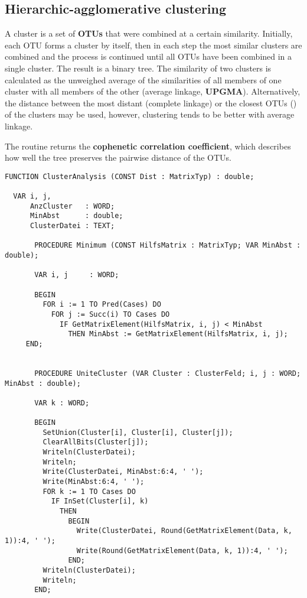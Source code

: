 \begin{refsection}
\section{Hierarchic-agglomerative clustering}

A cluster is a set of \textbf{\acf{OTU}s} that were combined at a certain similarity. Initially, each \acs{OTU} forms a cluster by itself, then in each step the most similar clusters are combined and the process is continued until all \acs{OTU}s have been combined in a single cluster. The result is a binary tree. The similarity of two clusters is calculated as the unweighed average of the similarities of all members of one cluster with all members of the other (average linkage, \textbf{\acf{UPGMA}}). Alternatively, the distance between the most distant (complete linkage) or the closest \acs{OTU}s () of the clusters may be used, however, clustering tends to be better with average linkage.

The routine returns the \textbf{cophenetic correlation coefficient}, which describes how well the tree preserves the pairwise distance of the \acs{OTU}s.

\begin{lstlisting}[caption=clustering]
  FUNCTION ClusterAnalysis (CONST Dist : MatrixTyp) : double;

  VAR i, j,
      AnzCluster   : WORD;
      MinAbst      : double;
      ClusterDatei : TEXT;

       PROCEDURE Minimum (CONST HilfsMatrix : MatrixTyp; VAR MinAbst : double);

       VAR i, j     : WORD;

       BEGIN
         FOR i := 1 TO Pred(Cases) DO
           FOR j := Succ(i) TO Cases DO
             IF GetMatrixElement(HilfsMatrix, i, j) < MinAbst
               THEN MinAbst := GetMatrixElement(HilfsMatrix, i, j);
     END;


       PROCEDURE UniteCluster (VAR Cluster : ClusterFeld; i, j : WORD; MinAbst : double);

       VAR k : WORD;

       BEGIN
         SetUnion(Cluster[i], Cluster[i], Cluster[j]);
         ClearAllBits(Cluster[j]);
         Writeln(ClusterDatei);
         Writeln;
         Write(ClusterDatei, MinAbst:6:4, ' ');
         Write(MinAbst:6:4, ' ');
         FOR k := 1 TO Cases DO
           IF InSet(Cluster[i], k)
             THEN
               BEGIN
                 Write(ClusterDatei, Round(GetMatrixElement(Data, k, 1)):4, ' ');
                 Write(Round(GetMatrixElement(Data, k, 1)):4, ' ');
               END;
         Writeln(ClusterDatei);
         Writeln;
       END;



\end{lstlisting}
\end{refsection}
